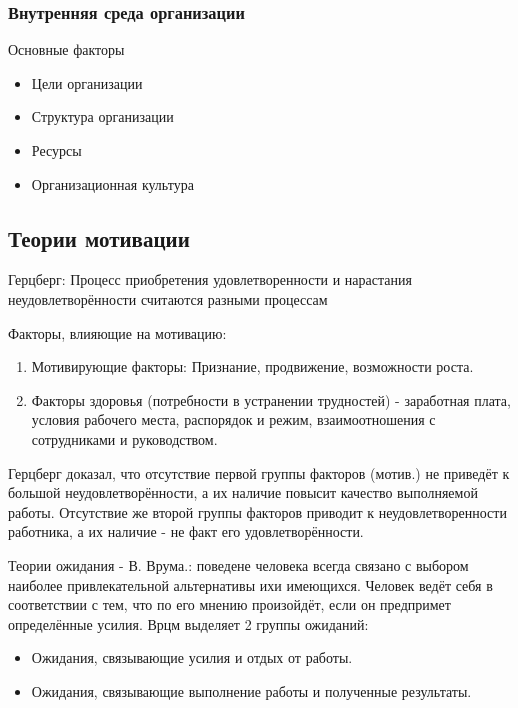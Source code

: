 \documentclass[a4paper,12pt]{report}
\begin{document}
\subsubsection{Внутренняя среда организации}
	Основные факторы
	\begin{itemize}
		\item	Цели организации
		\item	Структура организации
		\item	Ресурсы
		\item	Организационная культура
	\end{itemize}





\subsection{Теории мотивации}

	Герцберг:
	Процесс приобретения удовлетворенности и нарастания неудовлетворённости  считаются разными процессам

	Факторы, влияющие на мотивацию:
	\begin{enumerate}
		\item	Мотивирующие факторы: Признание, продвижение, возможности роста.
		\item	Факторы здоровья (потребности в устранении трудностей) - заработная плата, условия рабочего места, распорядок и режим, взаимоотношения с сотрудниками и руководством.
	\end{enumerate}

	Герцберг доказал, что отсутствие первой группы факторов (мотив.) не приведёт к большой неудовлетворённости, а их наличие повысит качество выполняемой работы. Отсутствие же второй группы факторов приводит к неудовлетворенности работника, а их наличие - не факт его удовлетворённости.


	Теории ожидания - В. Врума.: поведене человека всегда связано с выбором наиболее привлекательной альтернативы ихи имеющихся. Человек ведёт себя в соответствии с тем, что по его мнению произойдёт, если он предпримет определённые усилия.
	Врцм выделяет 2 группы ожиданий:
	\begin{itemize}
		\item 	Ожидания, связывающие усилия и отдых от работы.
		\item	Ожидания, связывающие выполнение работы и полученные результаты.
	\end{itemize}
\end{document}

